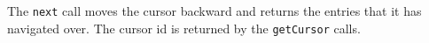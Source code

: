 The \verb+next+ call moves the cursor backward and returns the entries that it has
navigated over. The cursor id is returned by the \verb+getCursor+ calls.
